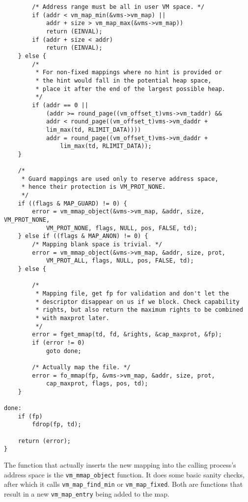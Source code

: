 \documentclass[shortabstract, english]{iithesis}
\newenvironment{code}{}{}
\begin{document}
\begin{code}
\begin{verbatim}
        /* Address range must be all in user VM space. */
        if (addr < vm_map_min(&vms->vm_map) ||
            addr + size > vm_map_max(&vms->vm_map))
            return (EINVAL);
        if (addr + size < addr)
            return (EINVAL);
    } else {
        /*
         * For non-fixed mappings where no hint is provided or
         * the hint would fall in the potential heap space,
         * place it after the end of the largest possible heap.
         */
        if (addr == 0 ||
            (addr >= round_page((vm_offset_t)vms->vm_taddr) &&
            addr < round_page((vm_offset_t)vms->vm_daddr +
            lim_max(td, RLIMIT_DATA))))
            addr = round_page((vm_offset_t)vms->vm_daddr +
                lim_max(td, RLIMIT_DATA));
    }

    /*
     * Guard mappings are used only to reserve address space,
     * hence their protection is VM_PROT_NONE.
     */
    if ((flags & MAP_GUARD) != 0) {
        error = vm_mmap_object(&vms->vm_map, &addr, size, VM_PROT_NONE,
            VM_PROT_NONE, flags, NULL, pos, FALSE, td);
    } else if ((flags & MAP_ANON) != 0) {
        /* Mapping blank space is trivial. */
        error = vm_mmap_object(&vms->vm_map, &addr, size, prot,
            VM_PROT_ALL, flags, NULL, pos, FALSE, td);
    } else {

        /*
         * Mapping file, get fp for validation and don't let the
         * descriptor disappear on us if we block. Check capability
         * rights, but also return the maximum rights to be combined
         * with maxprot later.
         */
        error = fget_mmap(td, fd, &rights, &cap_maxprot, &fp);
        if (error != 0)
            goto done;

        /* Actually map the file. */
        error = fo_mmap(fp, &vms->vm_map, &addr, size, prot,
            cap_maxprot, flags, pos, td);
    }

done:
    if (fp)
        fdrop(fp, td);

    return (error);
}
\end{verbatim}
\end{code}

The function that actually inserts the new mapping into the calling process's
address space is the \texttt{vm_mmap_object} function. It does some basic
sanity checks, after which it calls \texttt{vm_map_find_min} or
\texttt{vm_map_fixed}. Both are functions that result in a new
\texttt{vm_map_entry} being added to the map.
\end{document}

